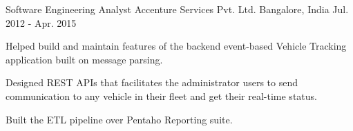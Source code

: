 \begin{cventries}
  \cventry
    {Software Engineering Analyst} %
    {Accenture Services Pvt. Ltd.} %
    {Bangalore, India} %
    {Jul. 2012 - Apr. 2015} %
    {
      \begin{cvitems} %
        \item {Helped build and maintain features of the backend event-based Vehicle Tracking application built on message parsing.}
        \item {Designed REST APIs that facilitates the administrator users to send communication to any vehicle in their fleet and get their real-time status.}
        \item {Built the ETL pipeline over Pentaho Reporting suite.}
      \end{cvitems}
    }

\end{cventries}
